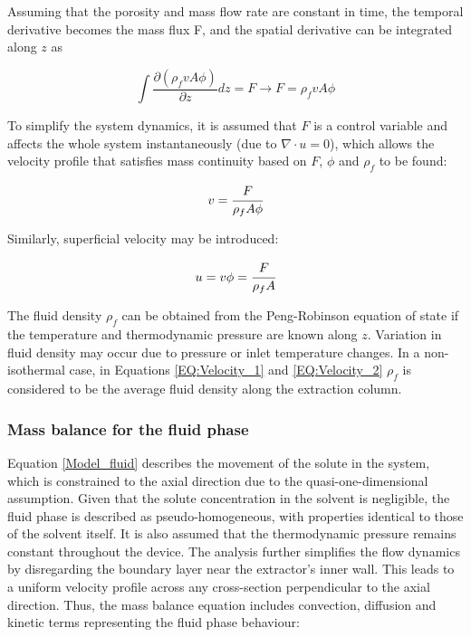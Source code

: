 \documentclass[a4paper,fleqn]{cas-dc}
\begin{document}
Assuming that the porosity and mass flow rate are constant in time, the temporal derivative becomes the mass flux F, and the spatial derivative can be integrated along $z$ as

{\footnotesize
	\begin{equation}
		\int \frac{\partial (\rho_f v A \phi )}{\partial z} dz = F \rightarrow F=\rho_f v A\phi
	\end{equation}
}

To simplify the system dynamics, it is assumed that $F$ is a control variable and affects the whole system instantaneously (due to $\nabla \cdot u = 0$), which allows the velocity profile that satisfies mass continuity based on $F$, $\phi$ and $\rho_f$ to be found:

{\footnotesize
	\begin{equation} \label{EQ:Velocity_1}
		v = \cfrac{F}{\rho_f A\phi} 
	\end{equation}
}

Similarly, superficial velocity may be introduced:

{\footnotesize
	\begin{equation} \label{EQ:Velocity_2}
		u = v \phi = \cfrac{F}{\rho_f A }
	\end{equation}
}

The fluid density $\rho_f$ can be obtained from the Peng-Robinson equation of state if the temperature and thermodynamic pressure are known along $z$. Variation in fluid density may occur due to pressure or inlet temperature changes. In a non-isothermal case, in Equations \ref{EQ:Velocity_1} and \ref{EQ:Velocity_2} $\rho_f$ is considered to be the average fluid density along the extraction column.

\subsubsection{Mass balance for the fluid phase} \label{CH: Mass_balance_fluid}

Equation \ref{Model_fluid} describes the movement of the solute in the system, which is constrained to the axial direction due to the quasi-one-dimensional assumption. Given that the solute concentration in the solvent is negligible, the fluid phase is described as pseudo-homogeneous, with properties identical to those of the solvent itself. It is also assumed that the thermodynamic pressure remains constant throughout the device. The analysis further simplifies the flow dynamics by disregarding the boundary layer near the extractor's inner wall. This leads to a uniform velocity profile across any cross-section perpendicular to the axial direction. Thus, the mass balance equation includes convection, diffusion and kinetic terms representing the fluid phase behaviour:
\end{document}
